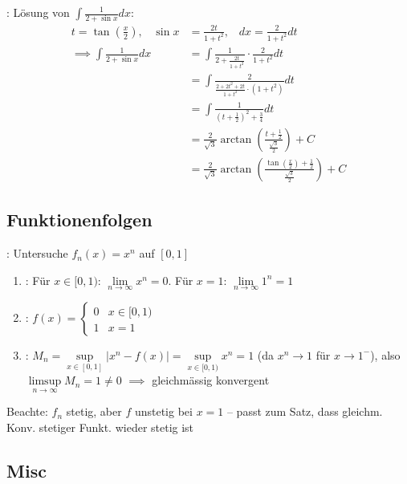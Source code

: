 \Bsp {}: Lösung von $\displaystyle \int \frac{1}{2 + \sin x} dx$:
\begin{align*}
    t = \tan(\frac{x}{2}), \hspace{10pt} \sin x &= \frac{2t}{1 + t^2}, \hspace{10pt} dx = \frac{2}{1 + t^2} dt \\[-0.1em]
    \implies \int \frac{1}{2 + \sin x} dx &= \int \frac{1}{2 + \frac{2t}{1 + t^2}} \cdot \frac{2}{1 + t^2} dt \\[-0.1em]
        &= \int \frac{2}{\frac{2 + 2t^2 + 2t}{1+t^2} \cdot (1+t^2)} dt \\[-0.1em]
        &= \int \frac{1}{(t + \frac{1}{2})^2 + \frac{3}{4}} dt \\[-0.4em]
        &= \frac{2}{\sqrt{3}} \arctan(\frac{t + \frac{1}{2}}{\frac{\sqrt{3}}{2}}) + C \\[-0.4em]
        &= \frac{2}{\sqrt{3}} \arctan(\frac{\tan(\frac{x}{2}) + \frac{1}{2}}{\frac{\sqrt{3}}{2}}) + C
\end{align*}

\subsection{Funktionenfolgen}

\begin{minipage}{\linewidth}
\Bsp {}: Untersuche $f_n(x) = x^n$ auf $[0,1]$
\begin{enumerate}
    \item {}: Für $x \in [0,1)$: $\lim\limits_{n\to\infty} x^n = 0$.
    Für $x=1$: $\lim\limits_{n\to\infty} 1^n = 1$
    \item {}: $f(x) = \begin{cases} 0 & x \in [0,1) \\ 1 & x = 1 \end{cases}$
    \item {}: $M_n = \sup\limits_{x\in[0,1]}|x^n - f(x)| = \sup\limits_{x\in[0,1)} x^n = 1$
    (da $x^n \to 1$ für $x \to 1^-$), also $\limsup\limits_{n\to\infty} M_n = 1 \ne 0$
    $\implies$  gleichmässig konvergent
\end{enumerate}
Beachte: $f_n$ stetig, aber $f$ unstetig bei $x=1$ -- passt zum Satz, dass gleichm.
Konv. stetiger Funkt. wieder stetig ist
\end{minipage}

\subsection{Misc}

